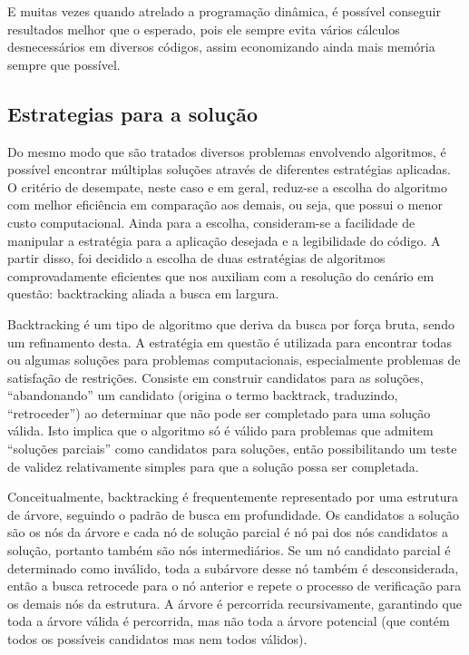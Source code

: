 \documentclass[relatorio]{IEEEtran}
\begin{document}
E muitas vezes quando atrelado a programação dinâmica, é possível conseguir resultados melhor que o esperado, pois ele sempre evita vários cálculos desnecessários em diversos códigos, assim economizando ainda mais memória sempre que possível.

\subsection{Estrategias para a solução}
Do mesmo modo que são tratados diversos problemas envolvendo algoritmos, é possível encontrar múltiplas soluções através de diferentes estratégias aplicadas. O critério de desempate, neste caso e em geral, reduz-se a escolha do algoritmo com melhor eficiência em comparação aos demais, ou seja, que possui o menor custo computacional. Ainda para a escolha, consideram-se a facilidade de manipular a estratégia para a aplicação desejada e a legibilidade do código. A partir disso, foi decidido a escolha de duas estratégias de algoritmos comprovadamente eficientes que nos auxiliam com a resolução do cenário em questão: backtracking aliada a busca em largura.

Backtracking é um tipo de algoritmo que deriva da busca por força bruta, sendo um refinamento desta. A estratégia em questão é utilizada para encontrar todas ou algumas soluções para problemas computacionais, especialmente problemas de satisfação de restrições. Consiste em construir candidatos para as soluções, “abandonando” um candidato (origina o termo backtrack, traduzindo, “retroceder”) ao determinar que não pode ser completado para uma solução válida. Isto implica que o algoritmo só é válido para problemas que admitem “soluções parciais” como candidatos para soluções, então possibilitando um teste de validez relativamente simples para que a solução possa ser completada.

Conceitualmente, backtracking é frequentemente representado por uma estrutura de árvore, seguindo o padrão de busca em profundidade. Os candidatos a solução são os nós da árvore e cada nó de solução parcial é nó pai dos nós candidatos a solução, portanto também são nós intermediários. Se um nó candidato parcial é determinado como inválido, toda a subárvore desse nó também é desconsiderada, então a busca retrocede para o nó anterior e repete o processo de verificação para os demais nós da estrutura. A árvore é percorrida recursivamente, garantindo que toda a árvore válida é percorrida, mas não toda a árvore potencial (que contém todos os possíveis candidatos mas nem todos válidos).
\end{document}
